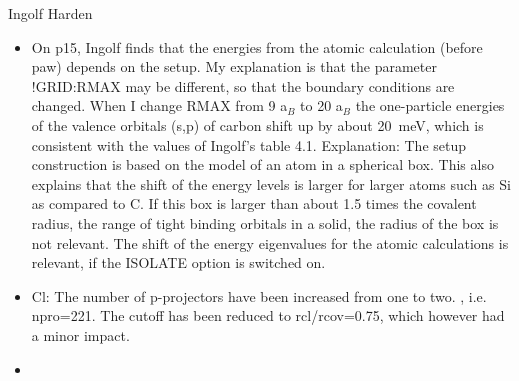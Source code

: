 \documentclass[11pt,a4paper]{report}
\begin{document}
Ingolf Harden 
\begin{itemize}
\item On p15, Ingolf finds that the energies from the atomic
  calculation (before paw) depends on the setup. My explanation is
  that the parameter !GRID:RMAX may be different, so that the boundary
  conditions are changed. When I change RMAX from 9 a$_B$ to 20 a$_B$
  the one-particle energies of the valence orbitals (s,p) of carbon
  shift up by about 20~meV, which is consistent with the values of
  Ingolf's table 4.1. Explanation: The setup construction is based on
  the model of an atom in a spherical box. This also explains that the
  shift of the energy levels is larger for larger atoms such as Si as
  compared to C. If this box is larger than about 1.5 times the
  covalent radius, the range of tight binding orbitals in a solid, the
  radius of the box is not relevant. The shift of the energy
  eigenvalues for the atomic calculations is relevant, if the ISOLATE
  option is switched on.
%
\item Cl: The number of p-projectors have been increased from one to
  two.  , i.e. npro=221. The cutoff has been reduced to rcl/rcov=0.75,
  which however had a minor impact. 
\item
\end{itemize}
 





\appendix
\end{document}
